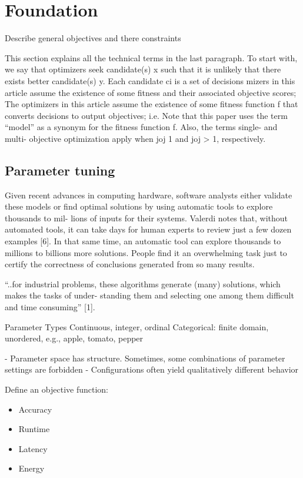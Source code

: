 \chapter{Foundation}
    Describe general objectives and there constraints


    This section explains all the technical terms in the last paragraph. To start with, we say that optimizers seek candidate(s) x such that it is 
    unlikely that there exists better candidate(s) y. Each candidate ci is a set of decisions mizers 
    in this article assume the existence of some fitness and their associated objective scores; 
    The optimizers in this article assume the existence of some fitness function f that converts decisions to output objectives; i.e.
    Note that this paper uses the term “model” as a synonym for the fitness function f. 
    Also, the terms single- and multi- objective optimization apply when joj 1 and joj > 1, respectively.

    \section{Parameter tuning}

        Given recent advances in computing hardware, software analysts either validate these models or find 
        optimal solutions by using automatic tools to explore thousands to mil- lions of inputs for their systems. 
        Valerdi notes that, without automated tools, it can take days for human experts to review just a few dozen examples [6]. 
        In that same time, an automatic tool can explore thousands to millions to billions more solutions. 
        People find it an overwhelming task just to certify the correctness of conclusions generated from so many results.

        “..for industrial problems, these algorithms generate (many) solutions, which makes the tasks of under- standing them and selecting one among them difficult and time consuming” [1].



        Parameter Types
        Continuous, integer, ordinal
        Categorical: finite domain, unordered, e.g., {apple, tomato, pepper}

        - Parameter space has structure. Sometimes, some combinations of parameter settings are forbidden
        - Configurations often yield qualitatively different behavior

        Define an objective function: 
        \begin{itemize}
            \item Accuracy
            \item Runtime
            \item Latency
            \item Energy
        \end{itemize}

